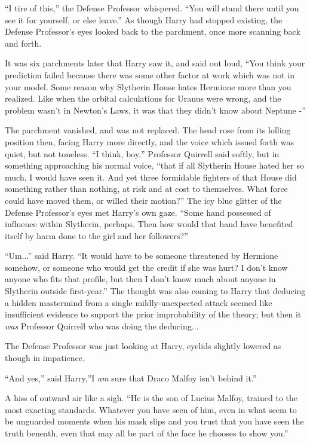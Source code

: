 ``I tire of this,'' the Defense Professor whispered. ``You will stand
there until you see it for yourself, or else leave.'' As though Harry
had stopped existing, the Defense Professor's eyes looked back to the
parchment, once more scanning back and forth.

It was six parchments later that Harry saw it, and said out loud, ``You
think your prediction failed because there was some other factor at work
which was not in your model. Some reason why Slytherin House hates
Hermione more than you realized. Like when the orbital calculations for
Uranus were wrong, and the problem wasn't in Newton's Laws, it was that
they didn't know about Neptune -''

The parchment vanished, and was not replaced. The head rose from its
lolling position then, facing Harry more directly, and the voice which
issued forth was quiet, but not toneless. ``I think, boy,'' Professor
Quirrell said softly, but in something approaching his normal voice,
``that if all Slytherin House hated her so much, I would have seen it.
And yet three formidable fighters of that House did something rather
than nothing, at risk and at cost to themselves. What force could have
moved them, or willed their motion?'' The icy blue glitter of the
Defense Professor's eyes met Harry's own gaze. ``Some hand possessed of
influence within Slytherin, perhaps. Then how would that hand have
benefited itself by harm done to the girl and her followers?''

``Um...'' said Harry. ``It would have to be someone threatened by
Hermione somehow, or someone who would get the credit if she was hurt? I
don't know anyone who fits that profile, but then I don't know much
about anyone in Slytherin outside first-year.'' The thought was also
coming to Harry that deducing a hidden mastermind from a single
mildly-unexpected attack seemed like insufficient evidence to support
the prior improbability of the theory; but then it \emph{was} Professor
Quirrell who was doing the deducing...

The Defense Professor was just looking at Harry, eyelids slightly
lowered as though in impatience.

``And yes,'' said Harry,''I \emph{am} sure that Draco Malfoy isn't
behind it.''

A hiss of outward air like a sigh. ``He is the son of Lucius Malfoy,
trained to the most exacting standards. Whatever you have seen of him,
even in what seem to be unguarded moments when his mask slips and you
trust that you have seen the truth beneath, even that may all be part of
the face he chooses to show you.''

